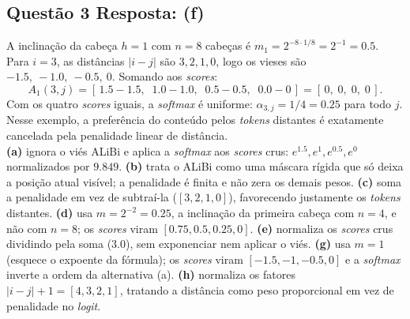 \documentclass[11pt,a4paper]{article}
\begin{document}
\subsection*{Questão 3 \textemdash{} Resposta: (f)}
A inclinação da cabeça $h = 1$ com $n = 8$ cabeças é $m_1 = 2^{-8 \cdot 1/8} = 2^{-1} = 0.5$. Para $i = 3$, as distâncias $|i - j|$ são $3, 2, 1, 0$, logo os vieses são $-1.5,\ -1.0,\ -0.5,\ 0$. Somando aos \textit{scores}:
\[
A_1(3, j) = [\,1.5 - 1.5,\;\; 1.0 - 1.0,\;\; 0.5 - 0.5,\;\; 0.0 - 0\,] = [\,0,\; 0,\; 0,\; 0\,].
\]
Com os quatro \textit{scores} iguais, a \textit{softmax} é uniforme: $\alpha_{3,j} = 1/4 = 0.25$ para todo $j$. Nesse exemplo, a preferência do conteúdo pelos \textit{tokens} distantes é exatamente cancelada pela penalidade linear de distância.\\
\textbf{(a)} ignora o viés ALiBi e aplica a \textit{softmax} aos \textit{scores} crus: $e^{1.5}, e^{1}, e^{0.5}, e^{0}$ normalizados por $9.849$.
\textbf{(b)} trata o ALiBi como uma máscara rígida que só deixa a posição atual visível; a penalidade é finita e não zera os demais pesos.
\textbf{(c)} soma a penalidade em vez de subtraí-la ($[3, 2, 1, 0]$), favorecendo justamente os \textit{tokens} distantes.
\textbf{(d)} usa $m = 2^{-2} = 0.25$, a inclinação da primeira cabeça com $n = 4$, e não com $n = 8$; os \textit{scores} viram $[0.75, 0.5, 0.25, 0]$.
\textbf{(e)} normaliza os \textit{scores} crus dividindo pela soma ($3.0$), sem exponenciar nem aplicar o viés.
\textbf{(g)} usa $m = 1$ (esquece o expoente da fórmula); os \textit{scores} viram $[-1.5, -1, -0.5, 0]$ e a \textit{softmax} inverte a ordem da alternativa (a).
\textbf{(h)} normaliza os fatores $|i - j| + 1 = [4, 3, 2, 1]$, tratando a distância como peso proporcional em vez de penalidade no \textit{logit}.
\end{document}
